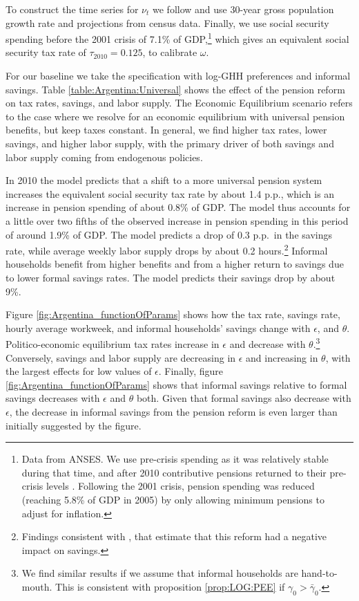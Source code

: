     
To construct the time series for $\nu_t$ we follow \textcite{mkvss08} and use 30-year gross population growth rate and projections from census data. Finally, we use social security spending before the 2001 crisis of 7.1\% of GDP,\footnote{Data from ANSES. We use pre-crisis spending as it was relatively stable during that time, and after 2010 contributive pensions returned to their pre-crisis levels \parencite{CetrangoloG}. Following the 2001 crisis, pension spending was reduced (reaching 5.8\% of GDP in 2005) by only allowing minimum pensions to adjust for inflation.} which gives an equivalent social security tax rate of $\tau_{2010}=0.125$, to calibrate $\omega$.





For our baseline we take the specification with log-GHH preferences and informal savings. Table \ref{table:Argentina:Universal} shows the effect of the pension reform on tax rates, savings, and labor supply. The Economic Equilibrium scenario refers to the case where we resolve for an economic equilibrium with universal pension benefits, but keep taxes constant. In general, we find higher tax rates, lower savings, and higher labor supply, with the primary driver of both savings and labor supply coming from endogenous policies.

In 2010 the model predicts that a shift to a more universal pension system increases the equivalent social security tax rate by about 1.4 p.p., which is an increase in pension spending of about 0.8\% of GDP. The model thus accounts for a little over two fifths of the observed increase in pension spending in this period of around 1.9\% of GDP. The model predicts a drop of 0.3 p.p.\ in the savings rate, while average weekly labor supply drops by about 0.2 hours.\footnote{Findings consistent with \textcite{Ruffo}, that estimate that this reform had a negative impact on savings.} Informal households benefit from higher benefits and from a higher return to savings due to lower formal savings rates. The model predicts their savings drop by about 9\%. 




Figure \ref{fig:Argentina_functionOfParams} 
shows how the tax rate, savings rate, hourly average workweek, and informal households' savings change with $\epsilon$, and $\theta$. Politico-economic equilibrium tax rates increase in $\epsilon$ and decrease with $\theta$.\footnote{We find similar results if we assume that informal  households are hand-to-mouth. This is consistent with proposition \ref{prop:LOG:PEE} if $\gamma_0>\bar{\gamma}_0$.} Conversely, savings and labor supply are decreasing in $\epsilon$ and increasing in $\theta$, with the largest effects for low values of $\epsilon$. Finally, figure \ref{fig:Argentina_functionOfParams} shows that informal savings relative to formal savings decreases with $\epsilon$ and $\theta$ both. Given that formal savings also decrease with $\epsilon$, the decrease in informal savings from the pension reform is even larger than initially suggested by the figure.

